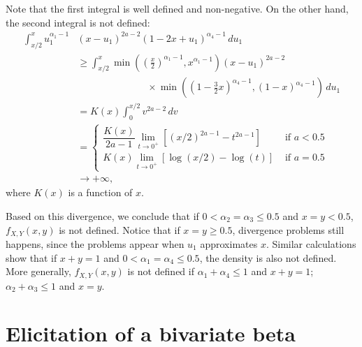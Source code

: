 Note that the first integral is well defined and non-negative. On the other hand, the second integral is not defined: 
\begin{equation*}
  \begin{split}
    \int_{x/2}^{x} u_1^{\alpha_1-1}&(x-u_1)^{2a-2}(1-2x+u_1)^{\alpha_4-1} \, du_1 \\
    &\ge \int_{x/2}^x \min\left(\left(\frac{x}{2}\right)^{\alpha_1-1}, x^{\alpha_1-1}\right)(x-u_1)^{2a-2} \\ 
    &\hspace{3cm} \times \min\left(\left(1-\frac{3}{2}x\right)^{\alpha_4-1}, (1-x)^{\alpha_4-1}\right) \, du_1 \\
    &= K(x) \int_{0}^{x/2} v^{2a-2} \, dv \\ 
    &= \begin{cases}
      \dfrac{K(x)}{2a-1} \lim_{t \to 0^+} \left[(x/2)^{2a-1} - t^{2a-1}\right] &\text{ if } a < 0.5 \\ 
      K(x) \lim_{t \to 0^+} \left[\log(x/2) - \log(t)\right] &\text{ if } a = 0.5
    \end{cases} \\
    &\to +\infty, 
  \end{split}
\end{equation*}
where $K(x)$ is a function of $x$. 

Based on this divergence, we conclude that if $0 < \alpha_2 = \alpha_3 \le 0.5$
and $x = y < 0.5$, $f_{X,Y}(x,y)$ is not defined. Notice that if $x = y \ge
0.5$, divergence problems still happens, since the problems appear when $u_1$ approximates $x$. Similar calculations show that if $x + y = 1$ and $0 < \alpha_1 = \alpha_4 \le 0.5$, the density is also
not defined. More generally, $f_{X,Y}(x,y)$ is not defined if $\alpha_1 +
\alpha_4 \le 1$ and $x + y = 1$; $\alpha_2 + \alpha_3 \le 1$ and $x = y$.

\section{Elicitation of a bivariate beta}

